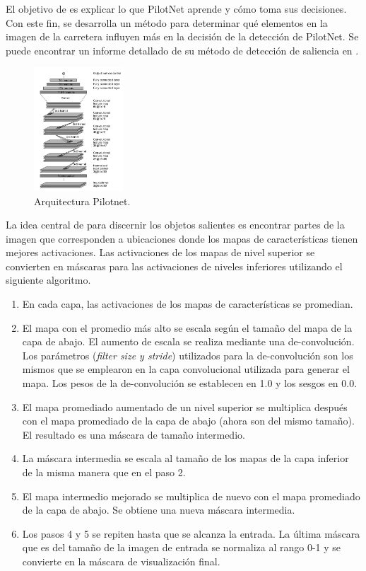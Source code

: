 El objetivo de \cite{explaining-end2end} es explicar lo que PilotNet aprende y cómo toma sus decisiones. Con este fin, se desarrolla un método para determinar qué elementos en la imagen de la carretera influyen más en la decisión de la detección de PilotNet. Se puede encontrar un informe detallado de su método de detección de saliencia en \cite{visual}.

\begin{figure}
\begin{center}
	\includegraphics[width=0.3\textwidth]{img/pilotnet.png}
   \caption{Arquitectura Pilotnet.}
	\label{fig.pilotnet}
\end{center}
\end{figure}

La idea central de \cite{explaining-end2end} para discernir los objetos salientes es encontrar partes de la imagen que corresponden a ubicaciones donde los mapas de características tienen mejores activaciones. Las activaciones de los mapas de nivel superior se convierten en máscaras para las activaciones de niveles inferiores utilizando el siguiente algoritmo.

\begin{enumerate}
    \item En cada capa, las activaciones de los mapas de características se promedian.
    \item El mapa con el promedio más alto se escala según el tamaño del mapa de la capa de abajo. El aumento de escala se realiza mediante una de-convolución. Los parámetros (\textit{filter size y stride}) utilizados para la de-convolución son los mismos que se emplearon en la capa convolucional utilizada para generar el mapa. Los pesos de la de-convolución se establecen en 1.0 y los sesgos en 0.0.
    \item El mapa promediado aumentado de un nivel superior se multiplica después con el mapa promediado de la capa de abajo (ahora son del mismo tamaño). El resultado es una máscara de tamaño intermedio.
    \item La máscara intermedia se escala al tamaño de los mapas de la capa inferior de la misma manera que en el paso 2.
    \item El mapa intermedio mejorado se multiplica de nuevo con el mapa promediado de la capa de abajo. Se obtiene una nueva máscara intermedia.
    \item Los pasos 4 y 5 se repiten hasta que se alcanza la entrada. La última máscara que es del tamaño de la imagen de entrada se normaliza al rango 0-1 y se convierte en la máscara de visualización final.
\end{enumerate}

